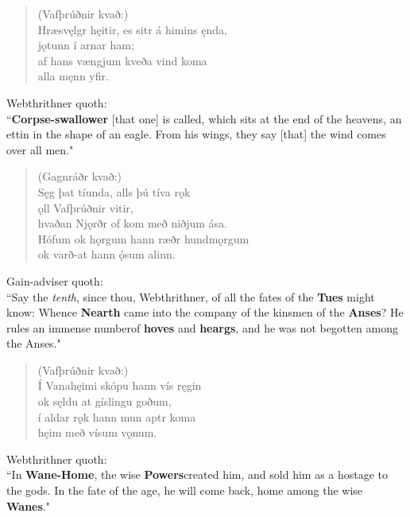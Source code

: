 \begin{verse}
(Vafþrúðnir kvað:) \\%
\bva Hræsvęlgr hęitir, \hld es sitr á himins ęnda, \\%
\ind jǫtunn í arnar ham; \\%
af hans vængjum \hld kveða vind koma \\%
\ind alla męnn yfir.\\%
\end{verse}

\bvb Webthrithner quoth: \\ “\textbf{Corpse-swallower} [that one] is called, which sits at the end of the heavens, an ettin in the shape of an eagle. From his wings, they say [that] the wind comes over all men." \\

\begin{verse}
(Gagnráðr kvað:) \\%
\bva Sęg þat tíunda, \hld alls þú tíva rǫk \\%
\ind ǫll Vafþrúðnir vitir, \\%
hvaðan Njǫrðr of kom \hld með niðjum ása. \\%
Hófum ok hǫrgum \hld hann ræðr hundmǫrgum \\%
\ind ok varð-at hann ǫ́sum alinn.\\%
\end{verse}

\bvb Gain-adviser quoth: \\ “Say the \emph{tenth}, since thou, Webthrithner, of all the fates of the \textbf{Tues} might know: Whence \textbf{Nearth} came into the company of the kinsmen of the \textbf{Anses}? He rules an immense number\footnotemark[68] of \textbf{hoves} and \textbf{heargs}, and he was not begotten among the Anses." \\

\begin{verse}
(Vafþrúðnir kvað:) \\%
\bva Í Vanahęimi \hld skópu hann vís ręgin \\%
\ind ok sęldu at gíslingu goðum, \\%
í aldar rǫk \hld hann mun aptr koma \\%
\ind hęim með vísum vǫnum.\\%
\end{verse}

\bvb Webthrithner quoth: \\ “In \textbf{Wane-Home}, the wise \textbf{Powers}\footnotemark[69] created him, and sold him as a hostage to the gods. In the fate of the age, he will come back, home among the wise \textbf{Wanes}." \\

